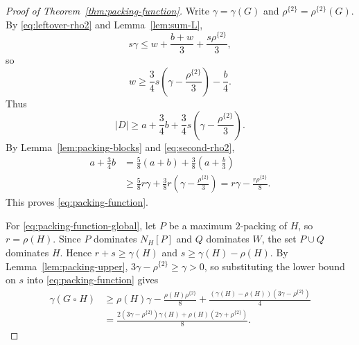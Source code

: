 \documentclass[10pt,a4paper]{amsart}
\newcommand{\N}{N}
\newcommand{\rhoTwo}{\rho^{\{2\}}}
\begin{document}
\begin{proof}[Proof of Theorem~\ref{thm:packing-function}]
Write $\gamma=\gamma(G)$ and $\rhoTwo=\rhoTwo(G)$. By
\eqref{eq:leftover-rho2} and Lemma~\ref{lem:sum-L},
\[
 s\gamma\leq w+\frac{b+w}{3}+\frac{s\rhoTwo}{3},
\]
so
\[
 w\geq\frac34s\left(\gamma-\frac{\rhoTwo}{3}\right)-\frac b4.
\]
Thus
\[
 |D|\geq a+\frac34b
 +\frac34s\left(\gamma-\frac{\rhoTwo}{3}\right).
\]
By Lemma~\ref{lem:packing-blocks} and \eqref{eq:second-rho2},
\begin{align*}
 a+\frac34b
 &=\frac58(a+b)+\frac38\left(a+\frac b3\right)\\
 &\geq\frac58r\gamma
 +\frac38r\left(\gamma-\frac{\rhoTwo}{3}\right)
 =r\gamma-\frac{r\rhoTwo}{8}.
\end{align*}
This proves \eqref{eq:packing-function}.

For \eqref{eq:packing-function-global}, let $P$ be a maximum $2$-packing of
$H$, so $r=\rho(H)$. Since $P$ dominates $\N_H[P]$ and $Q$ dominates $W$,
the set $P\cup Q$ dominates $H$. Hence
$r+s\geq\gamma(H)$ and $s\geq\gamma(H)-\rho(H)$. By
Lemma~\ref{lem:packing-upper},
$3\gamma-\rhoTwo\geq\gamma>0$, so substituting the lower bound on $s$ into
\eqref{eq:packing-function} gives
\begin{align*}
 \gamma(G\mathbin{\square}H)
 &\geq \rho(H)\gamma-\frac{\rho(H)\rhoTwo}{8}
 +\frac{(\gamma(H)-\rho(H))(3\gamma-\rhoTwo)}4\\
 &=\frac{2(3\gamma-\rhoTwo)\gamma(H)
 +\rho(H)(2\gamma+\rhoTwo)}8.
\end{align*}
\end{proof}
\end{document}

